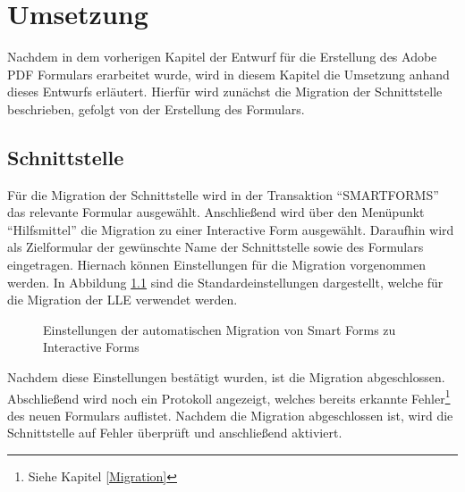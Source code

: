 \chapter{Umsetzung}


Nachdem in dem vorherigen Kapitel der Entwurf für die Erstellung des Adobe \ac{PDF} Formulars erarbeitet wurde, wird in diesem Kapitel die Umsetzung anhand dieses Entwurfs erläutert.
Hierfür wird zunächst die Migration der Schnittstelle beschrieben, gefolgt von der Erstellung des Formulars. 
 

\section{Schnittstelle}

Für die Migration der Schnittstelle wird in der Transaktion "`SMARTFORMS"' das relevante Formular ausgewählt. Anschließend wird über den Menüpunkt "`Hilfsmittel"' die Migration zu einer Interactive Form ausgewählt. Daraufhin wird als Zielformular der gewünschte Name der Schnittstelle sowie des Formulars eingetragen. Hiernach können Einstellungen für die Migration vorgenommen werden. In Abbildung \ref{mig-einst}
 sind die Standardeinstellungen dargestellt, welche für die Migration der \ac{LLE} verwendet werden.
 
 \begin{figure}[ht]
 	\centering
 	\caption{Einstellungen der automatischen Migration von Smart Forms zu Interactive Forms}
 	\label{mig-einst}
 \end{figure}

Nachdem diese Einstellungen bestätigt wurden, ist die Migration abgeschlossen. Abschließend wird noch ein Protokoll angezeigt, welches bereits erkannte Fehler\footnote{Siehe Kapitel \ref{Migration}} des neuen Formulars auflistet. Nachdem die Migration abgeschlossen ist, wird die Schnittstelle auf Fehler überprüft und anschließend aktiviert. 

